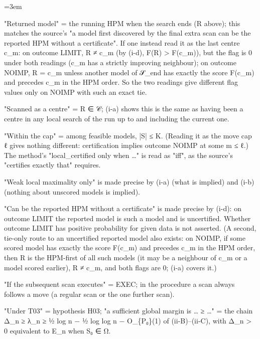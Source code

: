 \documentclass[11pt]{report}
\newcommand{\mdlbl}[1]{\textup{#1}}
\newenvironment{mdblock}{\begingroup\mdfont\raggedright\setlength{\parindent}{0pt}\setlength{\parskip}{0.55em}\emergencystretch=3em}{\par\endgroup}
\newcommand{\mdhead}[2]{\par\vspace{0.7em}\noindent{\bfseries\ifcase#1\or\large\or\normalsize\or\normalsize\or\small\or\small\or\small\fi #2}\par\nopagebreak\vspace{0.1em}}
\begin{document}
\begin{mdblock}
\begin{mdnum}
\item[\mdlbl{1.}] "Returned model" = the running HPM when the search ends (R above); this matches the source's "a model first discovered by the final extra scan can be the reported HPM without a certificate". If one instead read it as the last centre c\_m: on outcome LIMIT, R ≠ c\_m (by (i-d), F(R) > F(c\_m)), but the flag is 0 under both readings (c\_m has a strictly improving neighbour); on outcome NOIMP, R = c\_m unless another model of 𝒮\_end has exactly the score F(c\_m) and precedes c\_m in the HPM order. So the two readings give different flag values only on NOIMP with such an exact tie.
\item[\mdlbl{2.}] "Scanned as a centre" = R ∈ 𝒞; (i-a) shows this is the same as having been a centre in any local search of the run up to and including the current one.
\item[\mdlbl{3.}] "Within the cap" = among feasible models, |S| ≤ K. (Reading it as the move cap ℓ gives nothing different: certification implies outcome NOIMP at some m ≤ ℓ.) The method's "{\mdtt local\_\allowbreak{}certified} only when …" is read as "iff", as the source's "certifies exactly that" requires.
\item[\mdlbl{4.}] "Weak local maximality only" is made precise by (i-a) (what is implied) and (i-b) (nothing about unscored models is implied).
\item[\mdlbl{5.}] "Can be the reported HPM without a certificate" is made precise by (i-d): on outcome LIMIT the reported model is such a model and is uncertified. Whether outcome LIMIT has positive probability for given data is not asserted. (A second, tie-only route to an uncertified reported model also exists: on NOIMP, if some scored model has exactly the score F(c\_m) and precedes c\_m in the HPM order, then R is the HPM-first of all such models (it may be a neighbour of c\_m or a model scored earlier), R ≠ c\_m, and both flags are 0; (i-a) covers it.)
\item[\mdlbl{6.}] "If the subsequent scan executes" = EXEC; in the procedure a scan always follows a move (a regular scan or the one further scan).
\item[\mdlbl{7.}] "Under T03" = hypothesis H03; "a sufficient global margin is … ≥ …" = the chain Δ\_n ≥ λ\_n ≥ ½ log n − ½ log log n − O\_\{P₀\}(1) of (ii-B)–(ii-C), with Δ\_n > 0 equivalent to E\_n when S₀ ∈ Ω.
\end{mdnum}

\mdhead{2}{6. Change log}


\end{mdblock}
\end{document}

